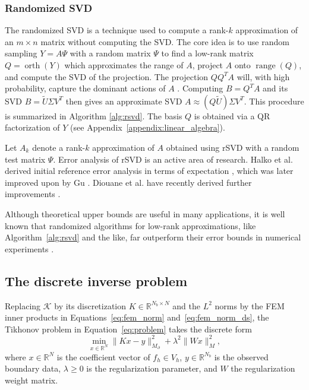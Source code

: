 \subsubsection{Randomized SVD}
The randomized SVD is a technique used to compute a rank-$k$ approximation of an $m\times n$ matrix without computing the SVD. The core idea is to use random sampling $Y = A \Psi$ with a random matrix $\Psi$ to find a low-rank matrix $Q = \operatorname{orth}(Y)$ which approximates the range of $A$, project $A$ onto $\operatorname{range}(Q)$, and compute the SVD of the projection. The projection $QQ^T A$ will, with high probability, capture the dominant actions of $A$ \cite{halkoFindingStructureRandomness2011}. Computing $B = Q^T A$ and its SVD $B = \tilde U \Sigma V^T$ then gives an approximate SVD $A \approx (Q \tilde U) \Sigma V^T$. This procedure is summarized in Algorithm \ref{alg:rsvd}. The basis $Q$ is obtained via a QR factorization of $Y$ (see Appendix~\ref{appendix:linear_algebra}).

Let $A_k$ denote a rank-$k$ approximation of $A$ obtained using rSVD with a random test matrix $\Psi$. Error analysis of rSVD is an active area of research. Halko et al. derived initial reference error analysis in terms of expectation \cite{halkoFindingStructureRandomness2011}, which was later improved upon by Gu \cite{guSubspaceIterationRandomization2015}. Diouane et al. have recently derived further improvements \cite{diouaneGeneralErrorAnalysis2022}.

Although theoretical upper bounds are useful in many applications, it is well known that randomized algorithms for low-rank approximations, like Algorithm~\ref{alg:rsvd} and the like, far outperform their error bounds in numerical experiments \cite{halkoFindingStructureRandomness2011,guSubspaceIterationRandomization2015,rokhlinFastRandomizedAlgorithm2008}.

%
%


\subsection{The discrete inverse problem}\label{sec:the_discrete_inverse_problem}

Replacing $\mathcal{K}$ by its discretization $K \in \mathbb{R}^{N_b \times N}$ and the $L^2$ norms by the FEM inner products in Equations~\eqref{eq:fem_norm} and~\eqref{eq:fem_norm_ds}, the Tikhonov problem in Equation~\eqref{eq:problem} takes the discrete form
\begin{equation}\label{eq:discrete_inverse_problem}
    \min_{x \in \mathbb{R}^N}
    \| K x - y \|_{M_\partial}^2
    + \lambda^2 \| W x \|_M^2,
\end{equation}
where $x \in \mathbb{R}^N$ is the coefficient vector of $f_h \in V_h$, $y \in \mathbb{R}^{N_b}$ is the observed boundary data, $\lambda \ge 0$ is the regularization parameter, and $W$ the regularization weight matrix.

